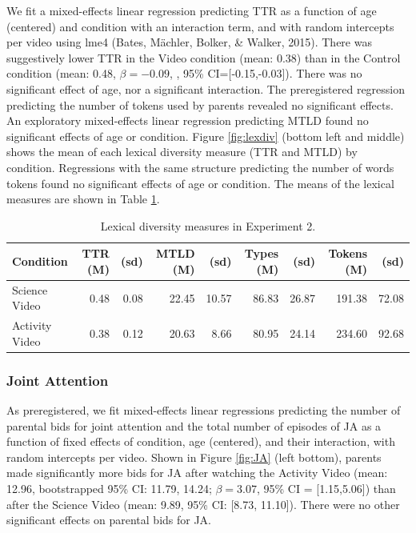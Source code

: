 \documentclass[man,floatsintext]{apa6}
\begin{document}
We fit a mixed-effects linear regression predicting TTR as a function of age (centered) and condition with an interaction term, and with random intercepts per video using lme4 (Bates, Mächler, Bolker, \& Walker, 2015).
There was suggestively lower TTR in the Video condition (mean: 0.38) than in the Control condition (mean: 0.48, \(\beta=-0.09\), , 95\% CI={[}-0.15,-0.03{]}).
There was no significant effect of age, nor a significant interaction.
The preregistered regression predicting the number of tokens used by parents revealed no significant effects.
An exploratory mixed-effects linear regression predicting MTLD found no significant effects of age or condition.
Figure \ref{fig:lexdiv} (bottom left and middle) shows the mean of each lexical diversity measure (TTR and MTLD) by condition.
Regressions with the same structure predicting the number of words tokens found no significant effects of age or condition.
The means of the lexical measures are shown in Table \ref{e2tab}.

\begin{table}[t]

\caption{\label{tab:e2tab}\label{e2tab} Lexical diversity measures in Experiment 2.}
\centering
\begin{tabular}{l|r|r|r|r|r|r|r|r}
\hline
Condition & TTR (M) & (sd) & MTLD (M) & (sd) & Types (M) & (sd) & Tokens (M) & (sd)\\
\hline
Science Video & 0.48 & 0.08 & 22.45 & 10.57 & 86.83 & 26.87 & 191.38 & 72.08\\
\hline
Activity Video & 0.38 & 0.12 & 20.63 & 8.66 & 80.95 & 24.14 & 234.60 & 92.68\\
\hline
\end{tabular}
\end{table}

\hypertarget{joint-attention-1}{%
\subsubsection{Joint Attention}\label{joint-attention-1}}

As preregistered, we fit mixed-effects linear regressions predicting the number of parental bids for joint attention and the total number of episodes of JA as a function of fixed effects of condition, age (centered), and their interaction, with random intercepts per video.
Shown in Figure \ref{fig:JA} (left bottom), parents made significantly more bids for JA after watching the Activity Video (mean: 12.96, bootstrapped 95\% CI: 11.79, 14.24; \(\beta=3.07\), 95\% CI = {[}1.15,5.06{]}) than after the Science Video (mean: 9.89, 95\% CI: {[}8.73, 11.10{]}).
There were no other significant effects on parental bids for JA.
\end{document}
